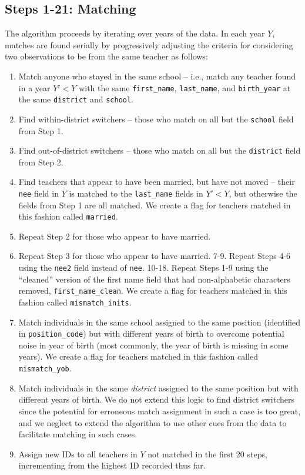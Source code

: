 \documentclass[12pt,]{article}
\providecommand{\tightlist}{%
  \setlength{\itemsep}{0pt}\setlength{\parskip}{0pt}}
\begin{document}
\subsection{Steps 1-21: Matching}\label{steps-1-21-matching}

The algorithm proceeds by iterating over years of the data. In each year
\(Y\), matches are found serially by progressively adjusting the
criteria for considering two observations to be from the same teacher as
follows:

\begin{enumerate}
\def\labelenumi{\arabic{enumi}.}
\tightlist
\item
  Match anyone who stayed in the same school -- i.e., match any teacher
  found in a year \(Y'<Y\) with the same \texttt{first\_name},
  \texttt{last\_name}, and \texttt{birth\_year} at the same
  \texttt{district} and \texttt{school}.
\item
  Find within-district switchers -- those who match on all but the
  \texttt{school} field from Step 1.
\item
  Find out-of-district switchers -- those who match on all but the
  \texttt{district} field from Step 2.
\item
  Find teachers that appear to have been married, but have not moved --
  their \texttt{nee} field in \(Y\) is matched to the
  \texttt{last\_name} fields in \(Y'<Y\), but otherwise the fields from
  Step 1 are all matched. We create a flag for teachers matched in this
  fashion called \texttt{married}.
\item
  Repeat Step 2 for those who appear to have married.
\item
  Repeat Step 3 for those who appear to have married. 7-9. Repeat Steps
  4-6 using the \texttt{nee2} field instead of \texttt{nee}. 10-18.
  Repeat Steps 1-9 using the ``cleaned'' version of the first name field
  that had non-alphabetic characters removed,
  \texttt{first\_name\_clean}. We create a flag for teachers matched in
  this fashion called \texttt{mismatch\_inits}.
\item
  Match individuals in the same school assigned to the same position
  (identified in \texttt{position\_code}) but with different years of
  birth to overcome potential noise in year of birth (most commonly, the
  year of birth is missing in some years). We create a flag for teachers
  matched in this fashion called \texttt{mismatch\_yob}.
\item
  Match individuals in the same \emph{district} assigned to the same
  position but with different years of birth. We do not extend this
  logic to find district switchers since the potential for erroneous
  match assignment in such a case is too great, and we neglect to extend
  the algorithm to use other cues from the data to facilitate matching
  in such cases.
\item
  Assign new IDs to all teachers in \(Y\) not matched in the first 20
  steps, incrementing from the highest ID recorded thus far.
\end{enumerate}
\end{document}
